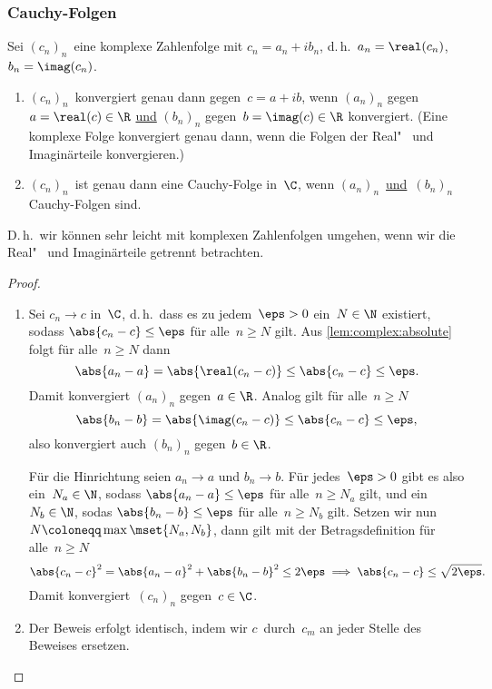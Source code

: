 \documentclass[a4paper]{article}
\begin{document}
\subsubsection{Cauchy-Folgen}

\begin{theorem}
    Sei $(c_n)_n$~eine komplexe Zahlenfolge mit $c_n = a_n+ib_n$, d.\,h.\ $a_n = \real(c_n)$, $b_n = \imag(c_n)$.
    \begin{enumerate}
        \item $(c_n)_n$~konvergiert genau dann gegen~$c = a+ib$, wenn $(a_n)_n$ gegen~$a = \real(c) \in \R$ \underline{und} $(b_n)_n$ gegen~$b = \imag(c) \in \R$ konvergiert. (Eine komplexe Folge konvergiert genau dann, wenn die Folgen der Real"~ und Imaginärteile konvergieren.)
        \item $(c_n)_n$~ist genau dann eine Cauchy-Folge in~$\C$, wenn $(a_n)_n$~\underline{und}~$(b_n)_n$ Cauchy-Folgen sind.
    \end{enumerate}
\end{theorem}

D.\,h.\ wir können sehr leicht mit komplexen Zahlenfolgen umgehen, wenn wir die Real"~ und Imaginärteile getrennt betrachten.

\begin{proof}\leavevmode
    \begin{enumerate}
        \item Sei $c_n \to c$ in~$\C$, d.\,h.\ dass es zu jedem~$\eps > 0$ ein~$N \in \N$ existiert, sodass $\abs{c_n-c} \leq \eps$ für alle~$n \geq N$ gilt. Aus \cref{lem:complex:absolute} folgt für alle~$n \geq N$ dann
              \begin{equation*}
                  \abs{a_n-a} = \abs{\real(c_n-c)} \leq \abs{c_n-c} \leq \eps.
              \end{equation*}
              Damit konvergiert $(a_n)_n$ gegen~$a \in \R$. Analog gilt für alle~$n \geq N$
              \begin{equation*}
                  \abs{b_n-b} = \abs{\imag(c_n-c)} \leq \abs{c_n-c} \leq \eps,
              \end{equation*}
              also konvergiert auch $(b_n)_n$ gegen~$b \in \R$.

              Für die Hinrichtung seien $a_n \to a$ und $b_n \to b$. Für jedes~$\eps > 0$ gibt es also ein~$N_a \in \N$, sodass $\abs{a_n-a} \leq \eps$ für alle~$n \geq N_a$ gilt, und ein~$N_b \in \N$, sodas $\abs{b_n-b} \leq \eps$ für alle~$n \geq N_b$ gilt. Setzen wir nun $N \coloneqq \max\mset{N_a,N_b}$, dann gilt mit der Betragsdefinition für alle~$n \geq N$
              \begin{equation*}
                  \abs{c_n-c}^2 = \abs{a_n-a}^2 + \abs{b_n-b}^2 \leq 2\eps \implies \abs{c_n-c} \leq \sqrt{2\eps}.
              \end{equation*}
              Damit konvergiert~$(c_n)_n$ gegen~$c \in \C$.
        \item Der Beweis erfolgt identisch, indem wir $c$~durch~$c_m$ an jeder Stelle des Beweises ersetzen.\qedhere
    \end{enumerate}
\end{proof}
\end{document}
